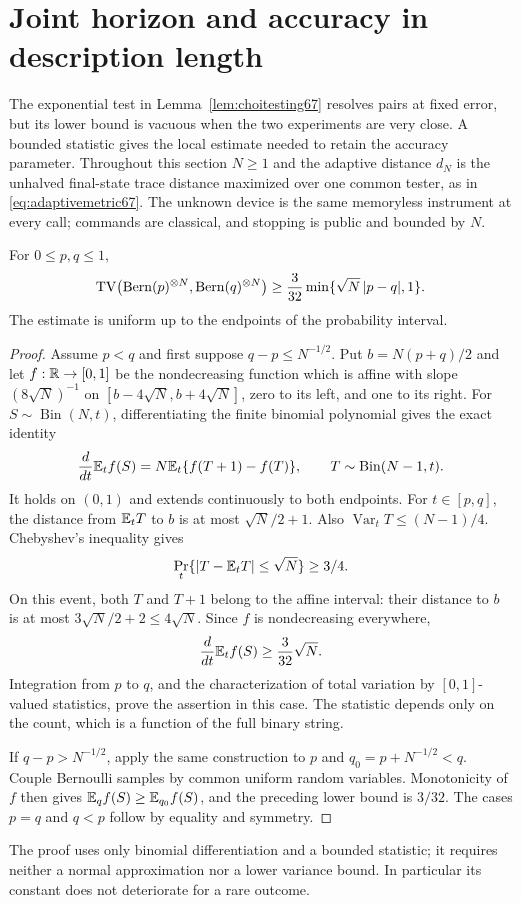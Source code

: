 \section{Joint horizon and accuracy in description length}\label{sec:jointdescription68}
The exponential test in Lemma~\ref{lem:choitesting67} resolves pairs at
fixed error, but its lower bound is vacuous when the two experiments are
very close. A bounded statistic gives the local estimate needed to retain
the accuracy parameter. Throughout this section $N\ge1$ and the adaptive
distance $d_N$ is the unhalved final-state trace distance maximized over
one common tester, as in \eqref{eq:adaptivemetric67}. The unknown device
is the same memoryless instrument at every call; commands are classical,
and stopping is public and bounded by $N$.

\begin{lemma}\label{lem:binarylocal68}
For $0\le p,q\le1$,
\begin{equation}\label{eq:binarylocal68}
 \operatorname{TV}\bigl(\operatorname{Bern}(p)^{\otimes N},
          \operatorname{Bern}(q)^{\otimes N}\bigr)
 \ge \frac3{32}\min\{\sqrt N\,|p-q|,1\}.
\end{equation}
The estimate is uniform up to the endpoints of the probability interval.
\end{lemma}
\begin{proof}
Assume $p<q$ and first suppose $q-p\le N^{-1/2}$. Put
$b=N(p+q)/2$ and let $f:\mathbb R\to[0,1]$ be the nondecreasing function
which is affine with slope $(8\sqrt N)^{-1}$ on
$[b-4\sqrt N,b+4\sqrt N]$, zero to its left, and one to its right.
For $S\sim\operatorname{Bin}(N,t)$, differentiating the finite binomial
polynomial gives the exact identity
\[
 \frac d{dt}\mathbb E_t f(S)
 =N\mathbb E_t\{f(T+1)-f(T)\},\qquad T\sim\operatorname{Bin}(N-1,t).
\]
It holds on $(0,1)$ and extends continuously to both endpoints. For
$t\in[p,q]$, the distance from $\mathbb E_tT$ to $b$ is at most
$\sqrt N/2+1$. Also $\operatorname{Var}_tT\le(N-1)/4$. Chebyshev's
inequality gives
\[
 \Pr_t\{|T-\mathbb E_tT|\le\sqrt N\}\ge3/4.
\]
On this event, both $T$ and $T+1$ belong to the affine interval:
their distance to $b$ is at most $3\sqrt N/2+2\le4\sqrt N$.
Since $f$ is nondecreasing everywhere,
\[
 \frac d{dt}\mathbb E_t f(S)\ge\frac3{32}\sqrt N.
\]
Integration from $p$ to $q$, and the characterization of total
variation by $[0,1]$-valued statistics, prove the assertion in this
case. The statistic depends only on the count, which is a function
of the full binary string.

If $q-p>N^{-1/2}$, apply the same construction to
$p$ and $q_0=p+N^{-1/2}<q$. Couple Bernoulli samples by common
uniform random variables. Monotonicity of $f$ then gives
$\mathbb E_qf(S)\ge\mathbb E_{q_0}f(S)$, and the preceding lower bound is $3/32$.
The cases $p=q$ and $q<p$ follow by equality and symmetry.
\end{proof}
The proof uses only binomial differentiation and a bounded statistic;
it requires neither a normal approximation nor a lower variance bound.
In particular its constant does not deteriorate for a rare outcome.


